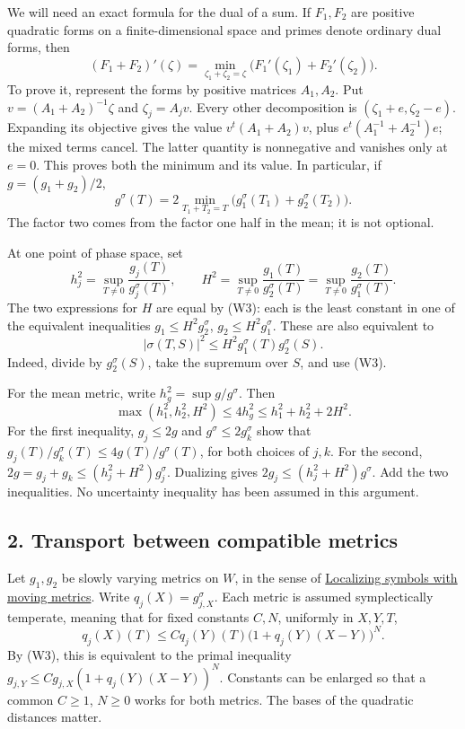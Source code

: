 \documentclass[
  11pt,
]{article}
\begin{document}
We will need an exact formula for the dual of a sum. If \(F_1,F_2\) are
positive quadratic forms on a finite-dimensional space and primes denote
ordinary dual forms, then \[
(F_1+F_2)'(\zeta)
=\min_{\zeta_1+\zeta_2=\zeta}
\big(F_1'(\zeta_1)+F_2'(\zeta_2)\big).
\tag{W4}
\] To prove it, represent the forms by positive matrices \(A_1,A_2\).
Put \(v=(A_1+A_2)^{-1}\zeta\) and \(\zeta_j=A_jv\). Every other
decomposition is \((\zeta_1+e,\zeta_2-e)\). Expanding its objective
gives the value \(v^t(A_1+A_2)v\), plus \(e^t(A_1^{-1}+A_2^{-1})e\); the
mixed terms cancel. The latter quantity is nonnegative and vanishes only
at \(e=0\). This proves both the minimum and its value. In particular,
if \(g=(g_1+g_2)/2\), \[
g^\sigma(T)=2\min_{T_1+T_2=T}
\big(g_1^\sigma(T_1)+g_2^\sigma(T_2)\big).
\tag{W5}
\] The factor two comes from the factor one half in the mean; it is not
optional.

At one point of phase space, set \[
h_j^2=\sup_{T\ne0}\frac{g_j(T)}{g_j^\sigma(T)},\qquad
H^2=\sup_{T\ne0}\frac{g_1(T)}{g_2^\sigma(T)}
=\sup_{T\ne0}\frac{g_2(T)}{g_1^\sigma(T)}.
\tag{W6}
\] The two expressions for \(H\) are equal by (W3): each is the least
constant in one of the equivalent inequalities
\(g_1\leq H^2g_2^\sigma\), \(g_2\leq H^2g_1^\sigma\). These are also
equivalent to \[
|\sigma(T,S)|^2\leq H^2g_1^\sigma(T)g_2^\sigma(S).
\tag{W7}
\] Indeed, divide by \(g_2^\sigma(S)\), take the supremum over \(S\),
and use (W3).

For the mean metric, write \(h_g^2=\sup g/g^\sigma\). Then \[
\max(h_1^2,h_2^2,H^2)\leq4h_g^2
\leq h_1^2+h_2^2+2H^2.
\tag{W8}
\] For the first inequality, \(g_j\leq2g\) and
\(g^\sigma\leq2g_k^\sigma\) show that
\(g_j(T)/g_k^\sigma(T)\leq4g(T)/g^\sigma(T)\), for both choices of
\(j,k\). For the second, \(2g=g_j+g_k\leq(h_j^2+H^2)g_j^\sigma\).
Dualizing gives \(2g_j\leq(h_j^2+H^2)g^\sigma\). Add the two
inequalities. No uncertainty inequality has been assumed in this
argument.

\subsection{2. Transport between compatible
metrics}\label{transport-between-compatible-metrics}

Let \(g_1,g_2\) be slowly varying metrics on \(W\), in the sense of
\href{metric-localization.pdf}{Localizing symbols with moving metrics}.
Write \(q_j(X)=g_{j,X}^\sigma\). Each metric is assumed symplectically
temperate, meaning that for fixed constants \(C,N\), uniformly in
\(X,Y,T\), \[
q_j(X)(T)\leq Cq_j(Y)(T)
\big(1+q_j(Y)(X-Y)\big)^N.
\tag{W9}
\] By (W3), this is equivalent to the primal inequality
\(g_{j,Y}\leq Cg_{j,X}(1+q_j(Y)(X-Y))^N\). Constants can be enlarged so
that a common \(C\geq1\), \(N\geq0\) works for both metrics. The bases
of the quadratic distances matter.
\end{document}
